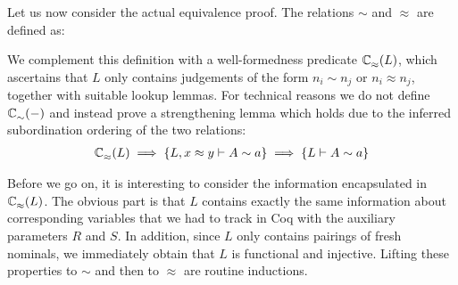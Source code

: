 \documentclass[a4paper,UKenglish]{lipics-v2016}
\newcommand{\ms}{\,}
\newcommand{\mrel}[1]{\mathrel{\ms #1 \ms}}
\newcommand{\tyr}{\mathrel{\sim}}
\newcommand{\tmr}{\mathrel{\approx}}
\newcommand{\lpPi}[1]{\mathbf{\Pi} #1.\ms\ms}
\newcommand{\lpApp}[2]{#1\langle#2\rangle}
\newcommand{\lpImp}{\mrel{=\!\blacktriangleright}}
\newcommand{\Prp}{\ensuremath{\textrm{\textasteriskcentered}}}
\newcommand{\All}{\ensuremath{\forall.\,}}
\newcommand{\Lam}[1]{\ensuremath{\lambda #1.\,}}
\newcommand{\TyLam}{\ensuremath{\Lambda.\,}}
\newcommand{\Prod}[1]{\ensuremath{\Pi #1.\,}}
\theoremstyle{plain}
\begin{document}
Let us now consider the actual equivalence proof.
The relations $\tyr$ and $\tmr$ are defined as:
{\small
{}
}
We complement this definition with a well-formedness predicate $\ac{\tmr}{~}{L}$, which ascertains that $L$ only contains judgements of the form $n_i \tyr n_j$ or $n_i \tmr n_j$, together with suitable lookup lemmas.
For technical reasons we do not define $\ac{\tyr}{~}{-}$ and instead prove a strengthening lemma which holds due to the inferred subordination ordering of the two relations:
\begin{align*}
  \ac{\tmr}{~}{L} \implies \aj{L, x \tmr y}{A \tyr a} \implies \aj{L}{A \tyr a}
\end{align*}

Before we go on, it is interesting to consider the information encapsulated in $\ac{\tmr}{~}{L}$.
The obvious part is that $L$ contains exactly the same information about corresponding variables that we had to track in Coq with the auxiliary parameters $R$ and $S$.
In addition, since $L$ only contains pairings of fresh nominals, we immediately obtain that $L$ is functional and injective.
Lifting these properties to $\tyr$ and then to $\tmr$ are routine inductions.
\end{document}
